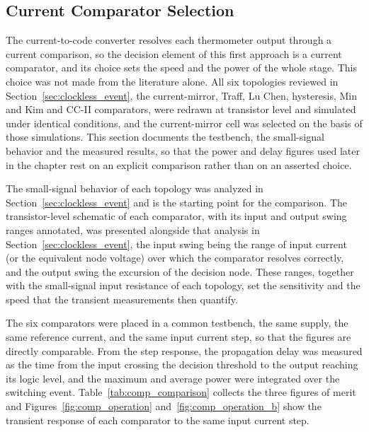 \subsection{Current Comparator Selection}
\label{subsec:comp_selection}

The current-to-code converter resolves each thermometer output through a
current comparison, so the decision element of this first approach is a
current comparator, and its choice sets the speed and the power of the whole
stage. This choice was not made from the literature alone. All six topologies
reviewed in Section~\ref{sec:clockless_event}, the current-mirror, Traff, Lu
Chen, hysteresis, Min and Kim and CC-II comparators, were redrawn at
transistor level and simulated under identical conditions, and the
current-mirror cell was selected on the basis of those simulations. This
section documents the testbench, the small-signal behavior and the measured
results, so that the power and delay figures used later in the chapter rest on
an explicit comparison rather than on an asserted choice.

The small-signal behavior of each topology was analyzed in
Section~\ref{sec:clockless_event} and is the starting point for the
comparison. The transistor-level schematic of each comparator, with its input
and output swing ranges annotated, was presented alongside that analysis in
Section~\ref{sec:clockless_event}, the input swing being the range of input
current (or the equivalent node voltage) over which the comparator resolves
correctly, and the output swing the excursion of the decision node. These
ranges, together with the small-signal input resistance of each topology, set
the sensitivity and the speed that the transient measurements then quantify.



The six comparators were placed in a common testbench, the same supply, the
same reference current, and the same input current step, so that the figures
are directly comparable. From the step response, the propagation delay was
measured as the time from the input crossing the decision threshold to the
output reaching its logic level, and the maximum and average power were
integrated over the switching event.
Table~\ref{tab:comp_comparison} collects the three figures of merit and
Figures~\ref{fig:comp_operation} and~\ref{fig:comp_operation_b} show the
transient response of each comparator to the same input current step.

